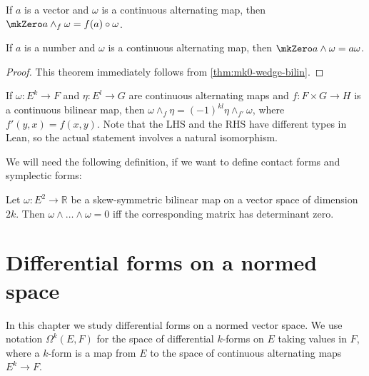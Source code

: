 \begin{theorem}%
  \label{thm:mk0-wedge-bilin}
  If \(a\) is a vector and \(\omega\) is a continuous alternating map,
  then \(\mkZero a \wedge_{f} \omega = f(a) \circ \omega\).
\end{theorem}

\begin{theorem}%
  \label{thm:mk0-wedge}
  If \(a\) is a number and \(\omega\) is a continuous alternating map,
  then \(\mkZero a \wedge \omega = a\omega\).
\end{theorem}
\begin{proof}
  This theorem immediately follows from \autoref{thm:mk0-wedge-bilin}.
\end{proof}

\begin{theorem}%
  \label{thm:wedge-comm}
  If \(\omega\colon E^{k}\to F\) and \(\eta\colon E^{l}\to G\) are continuous alternating maps
  and \(f \colon F \times G \to H\) is a continuous bilinear map,
  then \(\omega \wedge_{f} \eta = {(-1)}^{kl}\eta \wedge_{f'} \omega\),
  where \(f'(y, x) = f(x, y)\).
  Note that the LHS and the RHS have different types in Lean,
  so the actual statement involves a natural isomorphism.
\end{theorem}

We will need the following definition, if we want to define contact forms and symplectic forms:

\begin{theorem}%
  \label{thm:wedge-pow-zero-iff-det}
  Let \(\omega\colon E^{2}\to \mathbb R\) be a skew-symmetric bilinear map on a vector space of dimension \(2k\).
  Then \(\omega\wedge\dots\wedge\omega = 0\) iff the corresponding matrix has determinant zero.
\end{theorem}

\chapter{Differential forms on a normed space}%
\label{cha:differential-forms-normed-space}

In this chapter we study differential forms on a normed vector space.
We use notation \(\Omega^{k}(E, F)\) for the space of differential \(k\)-forms on \(E\) taking values in \(F\),
where a \(k\)-form is a map from \(E\) to the space of continuous alternating maps \(E^{k} \to F\).

